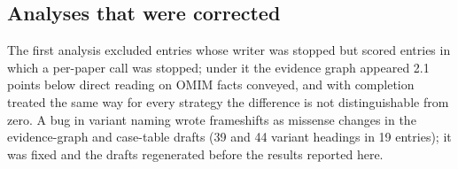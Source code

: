 \documentclass{article} %
\begin{document}
\subsection{Analyses that were corrected}
The first analysis excluded entries whose writer was stopped but scored entries in which a per-paper call was stopped; under it the evidence graph appeared 2.1 points below direct reading on OMIM facts conveyed, and with completion treated the same way for every strategy the difference is not distinguishable from zero. A bug in variant naming wrote frameshifts as missense changes in the evidence-graph and case-table drafts (39 and 44 variant headings in 19 entries); it was fixed and the drafts regenerated before the results reported here.
\FloatBarrier
\end{document}
